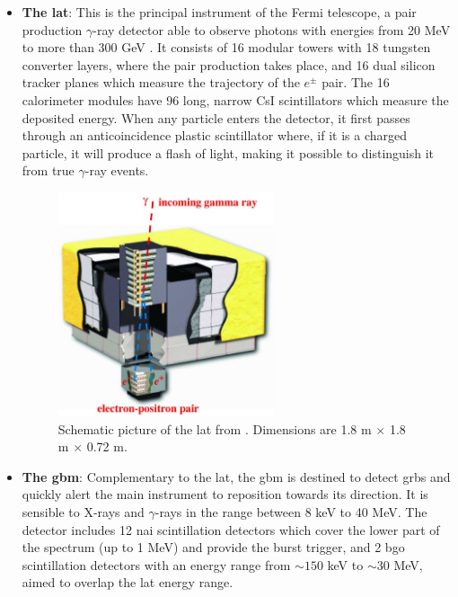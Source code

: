 \documentclass[main.tex]{subfiles}
\begin{document}
\begin{itemize}
    \item \textbf{The \gls{lat}}: This is the principal instrument of the Fermi telescope, a pair production $\gamma$-ray detector able to observe photons with energies from 20 MeV to more than 300 GeV \cite{2009FermiLAT}. It consists of 16 modular towers with 18 tungsten converter layers, where the pair production takes place, and 16 dual silicon tracker planes which measure the trajectory of the $e^{\pm}$ pair. The 16 calorimeter modules have 96 long, narrow CsI scintillators which measure the deposited energy. When any particle enters the detector, it first passes through an anticoincidence plastic scintillator where, if it is a charged particle, it will produce a flash of light, making it possible to distinguish it from true $\gamma$-ray events.\\
    
    \begin{figure}[h]
    \centering
    \includegraphics[width=0.60\textwidth]{Pictures/LAT.pdf}
    \caption{Schematic picture of the \gls{lat} from \cite{2009FermiLAT}. Dimensions are 1.8 m $\times$ 1.8 m $\times$ 0.72 m.}
    \label{fig:LAT}
    \end{figure}
    
    \item \textbf{The \gls{gbm}}: Complementary to the \gls{lat}, the \gls{gbm} is destined to detect \glspl{grb} and quickly alert the main instrument to reposition towards its direction. It is sensible to X-rays and $\gamma$-rays in the range between 8 keV to 40 MeV. The detector includes 12  \gls{nai}  scintillation detectors which cover the lower part of the spectrum (up to 1 MeV) and  provide the burst trigger, and 2 \gls{bgo} scintillation detectors with an energy range from $\sim 150$ keV to $\sim 30$ MeV, aimed to overlap the \gls{lat} energy range. 
    

\end{itemize}
\end{document}
